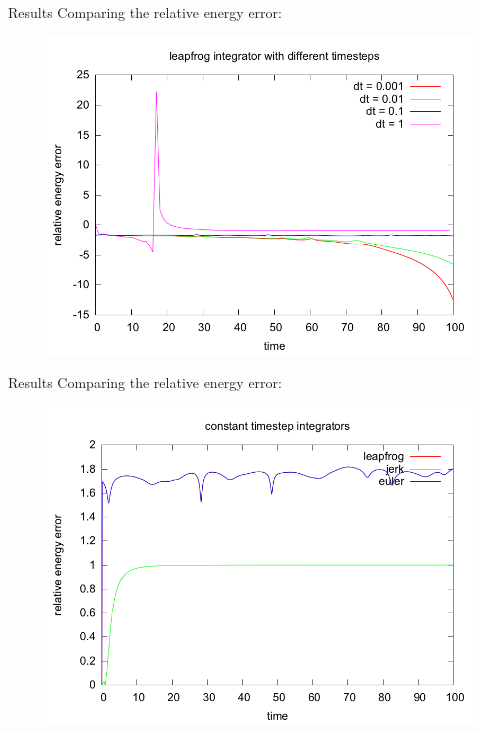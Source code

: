 \documentclass{beamer}
\begin{document}
\begin{frame}{Results}
  Comparing the relative energy error:
  \begin{figure}
   \includegraphics[width=0.6\paperwidth]{../results/leapfrog_different_timesteps.png}
\end{figure}
\end{frame}

\begin{frame}{Results}
  Comparing the relative energy error:
  \begin{figure}
   \includegraphics[width=0.6\paperwidth]{../results/constant_time.png}
\end{figure}
\end{frame}
\end{document}

